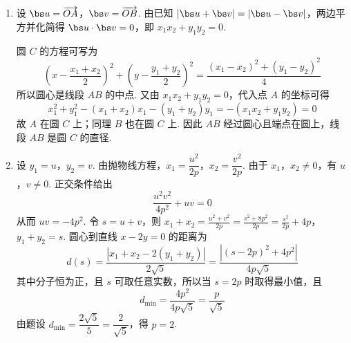\begin{solution}
\begin{enumerate}
\item 设 \(\bs u=\overrightarrow{OA}\)，\(\bs v=\overrightarrow{OB}\). 由已知
\(\lvert\bs u+\bs v\rvert=\lvert\bs u-\bs v\rvert\)，两边平方并化简得 \(\bs u\cdot\bs v=0\)，即 \(x_1x_2+y_1y_2=0\).

圆 \(C\) 的方程可写为
\[
\left(x-\frac{x_1+x_2}{2}\right)^2+\left(y-\frac{y_1+y_2}{2}\right)^2=\frac{(x_1-x_2)^2+(y_1-y_2)^2}{4}
\]
所以圆心是线段 \(AB\) 的中点. 又由 \(x_1x_2+y_1y_2=0\)，代入点 \(A\) 的坐标可得
\[
x_1^2+y_1^2-(x_1+x_2)x_1-(y_1+y_2)y_1=-(x_1x_2+y_1y_2)=0
\]
故 \(A\) 在圆 \(C\) 上；同理 \(B\) 也在圆 \(C\) 上. 因此 \(AB\) 经过圆心且端点在圆上，线段 \(AB\) 是圆 \(C\) 的直径.
\item 设 \(y_1=u\)，\(y_2=v\). 由抛物线方程，\(x_1=\dfrac{u^2}{2p}\)，\(x_2=\dfrac{v^2}{2p}\). 由于 \(x_1\)，\(x_2\neq0\)，有 \(u\)，\(v\neq0\). 正交条件给出
\[
\frac{u^2v^2}{4p^2}+uv=0
\]
从而 \(uv=-4p^2\). 令 \(s=u+v\)，则
\(x_1+x_2=\frac{u^2+v^2}{2p}=\frac{s^2+8p^2}{2p}=\frac{s^2}{2p}+4p\)，\(y_1+y_2=s\).
圆心到直线 \(x-2y=0\) 的距离为
\[
d(s)=\frac{\left|x_1+x_2-2(y_1+y_2)\right|}{2\sqrt5}=\frac{\left|(s-2p)^2+4p^2\right|}{4p\sqrt5}
\]
其中分子恒为正，且 \(s\) 可取任意实数，所以当 \(s=2p\) 时取得最小值，且
\[
d_{\min}=\frac{4p^2}{4p\sqrt5}=\frac{p}{\sqrt5}
\]
由题设 \(d_{\min}=\dfrac{2\sqrt5}{5}=\dfrac{2}{\sqrt5}\)，得 \(p=2\).
\end{enumerate}
\end{solution}
